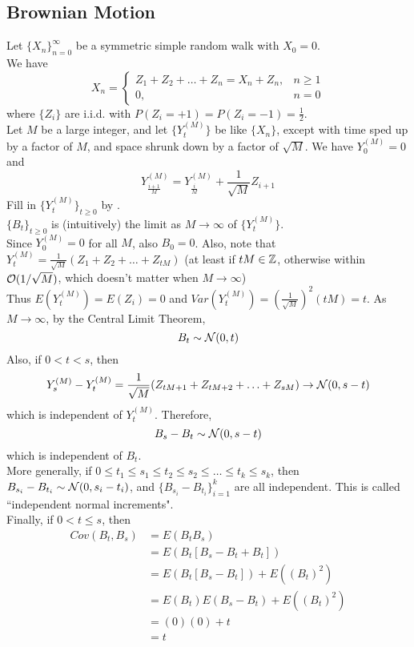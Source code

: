\documentclass[11pt]{article}
\newcommand{\dur}[3]{{#1}_{#2}^{({#3})}}
\begin{document}
    \subsection{Brownian Motion}
    Let $\{X_n\}_{n=0}^\infty$ be a symmetric simple random walk with $X_0 = 0$. \\
    We have 
    $$X_n = \begin{cases}Z_1 + Z_2 + \hdots + Z_n = X_n + Z_n, & n \geq 1\\
 	0, & n = 0	
 	\end{cases}$$
    where $\{Z_i\}$ are i.i.d. with $P(Z_i = +1) = P(Z_i = -1) = \frac{1}{2}$.\\
    Let $M$ be a large integer, and let $\{Y_t^{(M)}\}$ be like $\{X_n\}$, except with time sped up by a factor of $M$, and space shrunk down by a factor of $\sqrt{M}$. We have $\dur{Y}{0}{M} = 0$ and
    $$\dur{Y}{\frac{i+1}{M}}{M} = \dur{Y}{\frac{i}{M}}{M} + \frac{1}{\sqrt{M}}Z_{i+1}$$
    Fill in $\{\dur{Y}{t}{M}\}_{t \geq 0}$ by .\\
     $\{B_t\}_{t\geq 0}$ is (intuitively) the limit as $M \rightarrow \infty$ of $\{\dur{Y}{t}{M}\}$.\\
    Since $\dur{Y}{0}{M} = 0$ for all $M$, also $B_0 = 0$. Also, note that $\dur{Y}{t}{M} = \frac{1}{\sqrt{M}}(Z_1 + Z_2 + \hdots + Z_{tM})$ (at least if $tM \in \mathbb{Z}$, otherwise within $\mathcal{O}(1/\sqrt{M})$, which doesn't matter when $M \rightarrow \infty$)\\
    Thus $E(\dur{Y}{t}{M})= E(Z_i) = 0$ and $Var(\dur{Y}{t}{M}) = (\frac{1}{\sqrt{M}})^2(tM) = t$. As $M \rightarrow \infty$, by the Central Limit Theorem,
    $$B_t \sim \mathcal{N}(0,t)$$    
    Also, if $0 < t < s$, then 
    $$\dur{Y}{s}{M} - \dur{Y}{t}{M} = \frac{1}{\sqrt{M}}(Z_{tM+1} + Z_{tM+2} + \hdots + Z_{sM}) \rightarrow \mc{N}(0, s-t)$$ which is independent of $\dur{Y}{t}{M}$.
    Therefore,
    $$B_s - B_t \sim \mathcal{N}(0, s-t)$$
    which is independent of $B_t$.\\
    More generally, if $0 \leq t_1 \leq s_1 \leq t_2 \leq s_2 \leq \hdots \leq t_k \leq s_k$, then $B_{s_i} - B_{t_i} \sim \mathcal{N}(0, s_i - t_i)$, and $\{B_{s_i} - B_{t_i}\}_{i=1}^k$ are all independent. This is called ``independent normal increments".\\
    Finally, if $0 < t \leq s$, then
    \begin{align*}
    	Cov(B_t, B_s) &= E(B_tB_s) \\
    	&= E(B_t[B_s - B_t + B_t]) \\
    	&= E(B_t[B_s - B_t]) + E((B_t)^2) \\
    	&= E(B_t)E(B_s - B_t) + E((B_t)^2) \tag{Since $B_t$ and $B_s - B_t$ are independent}\\
    	&= (0)(0) + t \\
    	&= t
    \end{align*}
\end{document}
